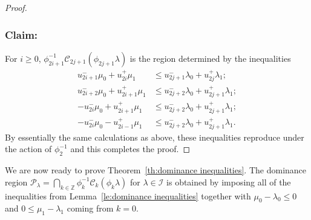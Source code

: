 \documentclass[pdflatex,sn-mathphys]{sn-jnl}%
\theoremstyle{thmstyleone}%
\theoremstyle{thmstyletwo}%
\theoremstyle{thmstylethree}%
\newcommand{\cC}{\mathcal{C}}
\newcommand{\cI}{\mathcal{I}}
\newcommand{\cP}{\mathcal{P}}
\newcommand{\ZZ}{\mathbb{Z}}
\begin{document}
\begin{proof}
    \subsubsection*{Claim:} For $i\ge 0$, $\phi_{2i+1}^{-1}\cC_{2j+1}(\phi_{2j+1}\lambda)$ is the region determined by the inequalities 
    \begin{align*}
      \tag{a$'$} u_{2i+1}^-\mu_0+u_{2i}^+\mu_1 &\le u_{2j+1}^-\lambda_0+u_{2j}^+\lambda_1;\\
      \tag{b$'$} u_{2i+2}^-\mu_0+u_{2i+1}^+\mu_1 &\le u_{2j+2}^-\lambda_0+u_{2j+1}^+\lambda_1;\\
      \tag{c$'$} -u_{2i}^-\mu_0+u_{2i+1}^+\mu_1 &\le u_{2j+2}^-\lambda_0+u_{2j+1}^+\lambda_1;\\
      \tag{d$'$} -u_{2i}^-\mu_0-u_{2i-1}^+\mu_1 &\le u_{2j+2}^-\lambda_0+u_{2j+1}^+\lambda_1.
    \end{align*}
    By essentially the same calculations as above, these inequalities reproduce under the action of $\phi_2^{-1}$ and this completes the proof.
  \end{proof}

  We are now ready to prove Theorem~\ref{th:dominance inequalities}.
  The dominance region $\cP_\lambda=\bigcap_{k\in\ZZ}\phi_k^{-1}\cC_k(\phi_k\lambda)$ for $\lambda\in\cI$ is obtained by imposing all of the inequalities from Lemma~\ref{le:dominance inequalities} together with $\mu_0 -\lambda_0 \le 0$ and $0 \le \mu_1 - \lambda_1$ coming from $k=0$.
\end{document}
